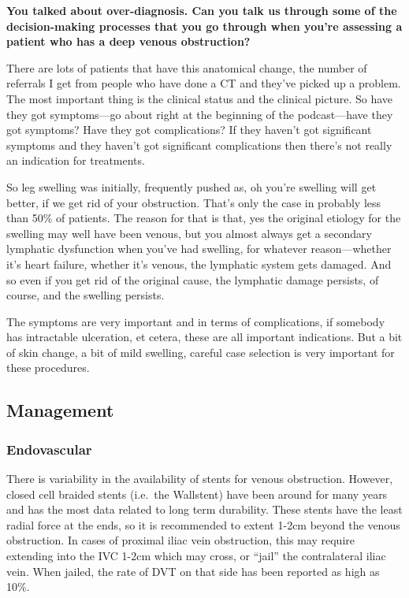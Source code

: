 \documentclass[
]{book}
\begin{document}
\textbf{You talked about over-diagnosis. Can you talk us through some of the
decision-making processes that you go through when you're assessing a
patient who has a deep venous obstruction?}

There are lots of patients that have this anatomical change, the number
of referrals I get from people who have done a CT and they've picked up
a problem. The most important thing is the clinical status and the
clinical picture. So have they got symptoms---go about right at the
beginning of the podcast---have they got symptoms? Have they got
complications? If they haven't got significant symptoms and they haven't
got significant complications then there's not really an indication for
treatments.

So leg swelling was initially, frequently pushed as, oh you're swelling
will get better, if we get rid of your obstruction. That's only the case
in probably less than 50\% of patients. The reason for that is that, yes
the original etiology for the swelling may well have been venous, but
you almost always get a secondary lymphatic dysfunction when you've had
swelling, for whatever reason---whether it's heart failure, whether it's
venous, the lymphatic system gets damaged. And so even if you get rid of
the original cause, the lymphatic damage persists, of course, and the
swelling persists.

The symptoms are very important and in terms of complications, if
somebody has intractable ulceration, et cetera, these are all important
indications. But a bit of skin change, a bit of mild swelling, careful
case selection is very important for these procedures.

\hypertarget{management-31}{%
\subsection{Management}\label{management-31}}

\hypertarget{endovascular-1}{%
\subsubsection{Endovascular}\label{endovascular-1}}

There is variability in the availability of stents for venous
obstruction. However, closed cell braided stents (i.e.~the Wallstent)
have been around for many years and has the most data related to long
term durability.\citep{gagne2019} These stents have the least radial force at
the ends, so it is recommended to extent 1-2cm beyond the venous
obstruction. In cases of proximal iliac vein obstruction, this may
require extending into the IVC 1-2cm which may cross, or ``jail'' the
contralateral iliac vein. When jailed, the rate of DVT on that side has
been reported as high as 10\%.\citep{murphy2017, le2018}
\end{document}
